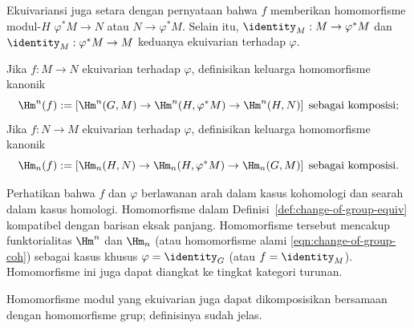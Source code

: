 Ekuivariansi juga setara dengan pernyataan bahwa $f$ memberikan homomorfisme
modul-$H$ $\varphi^*M\to N$ atau $N\to\varphi^*M$. Selain itu,
$\identity_M:M\to\varphi^*M$ dan
$\identity_M:\varphi^*M\to M$ keduanya ekuivarian terhadap $\varphi$.

\begin{definition}\label{def:change-of-group-equiv}
	Jika $f:M\to N$ ekuivarian terhadap $\varphi$, definisikan keluarga
	homomorfisme kanonik
	\[ \Hm^n(f) := \left[ \Hm^n(G, M) \to \Hm^n(H, \varphi^* M) \to \Hm^n(H, N) \right] \;\text{sebagai komposisi}; \]
	Jika $f:N\to M$ ekuivarian terhadap $\varphi$, definisikan keluarga
	homomorfisme kanonik
	\[ \Hm_n(f) := \left[ \Hm_n(H, N) \to \Hm_n(H, \varphi^* M) \to \Hm_n(G, M) \right] \;\text{sebagai komposisi}. \]
\end{definition}

Perhatikan bahwa $f$ dan $\varphi$ berlawanan arah dalam kasus kohomologi dan
searah dalam kasus homologi. Homomorfisme dalam
Definisi~\ref{def:change-of-group-equiv} kompatibel dengan barisan eksak
panjang. Homomorfisme tersebut mencakup funktorialitas $\Hm^n$ dan $\Hm_n$
(atau homomorfisme alami \eqref{eqn:change-of-group-coh}) sebagai kasus khusus
$\varphi=\identity_G$ (atau $f=\identity_M$). Homomorfisme ini juga dapat
diangkat ke tingkat kategori turunan.

Homomorfisme modul yang ekuivarian juga dapat dikomposisikan bersamaan dengan
homomorfisme grup; definisinya sudah jelas.

